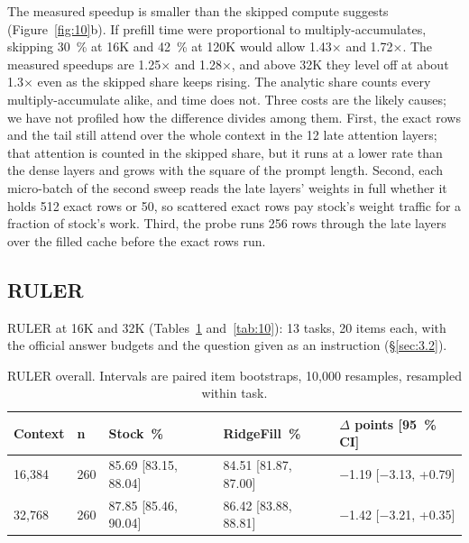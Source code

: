 \documentclass[11pt]{article}
\begin{document}
The measured speedup is smaller than the skipped compute suggests (Figure~\ref{fig:10}b). If prefill time were proportional to multiply-accumulates, skipping 30~\% at 16K and 42~\% at 120K would allow 1.43$\times$ and 1.72$\times$. The measured speedups are 1.25$\times$ and 1.28$\times$, and above 32K they level off at about 1.3$\times$ even as the skipped share keeps rising. The analytic share counts every multiply-accumulate alike, and time does not. Three costs are the likely causes; we have not profiled how the difference divides among them. First, the exact rows and the tail still attend over the whole context in the 12 late attention layers; that attention is counted in the skipped share, but it runs at a lower rate than the dense layers and grows with the square of the prompt length. Second, each micro-batch of the second sweep reads the late layers' weights in full whether it holds 512 exact rows or 50, so scattered exact rows pay stock's weight traffic for a fraction of stock's work. Third, the probe runs 256 rows through the late layers over the filled cache before the exact rows run.


\subsection{RULER}\label{sec:4.5}
RULER at 16K and 32K (Tables~\ref{tab:9} and~\ref{tab:10}): 13 tasks, 20 items each, with the official answer budgets and the question given as an instruction (\S\ref{sec:3.2}).

\begin{table}[!htbp]
\centering
\caption{RULER overall. Intervals are paired item bootstraps, 10,000 resamples, resampled within task.}\label{tab:9}
\small
\setlength{\tabcolsep}{4pt}
\begin{tabular}{lllll}
\toprule
Context & n & Stock~\% & RidgeFill~\% & $\Delta$ points [95~\% CI] \\
\midrule
16,384 & 260 & 85.69 [83.15, 88.04] & 84.51 [81.87, 87.00] & $-$1.19 [$-$3.13, +0.79] \\
32,768 & 260 & 87.85 [85.46, 90.04] & 86.42 [83.88, 88.81] & $-$1.42 [$-$3.21, +0.35] \\
\bottomrule
\end{tabular}
\end{table}
\end{document}
